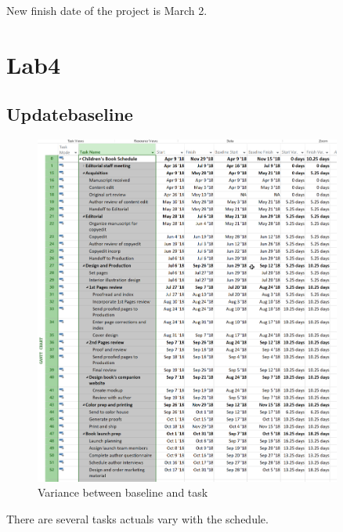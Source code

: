 \documentclass[runningheads]{llncs}
\begin{document}
New finish date of the project is March 2.

\clearpage
\section*{Lab4}
\subsection*{Updatebaseline}
\begin{figure}[H]
    \centering
    \includegraphics[width=0.9\textwidth]{./image/t4f1}
    \caption{Variance between baseline and task}
\end{figure}

There are several tasks actuals vary with the schedule.
\end{document}
